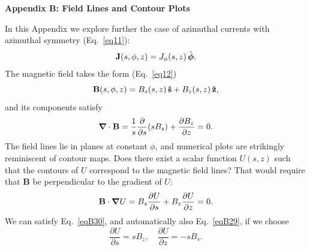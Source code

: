 \documentclass[aps,prb,twocolumn,groupedaddress,noshowpacs,checklength,amsmath]{revtex4-1}
\newcommand{\grad}{\mbox{\boldmath $\nabla$}}
\def\zhat{{\bf \hat z}}
\def\phat{{\hat{\mbox{\boldmath$\phi$}}}}
\def\shat{{\bf \hat s}}
\begin{document}
\bigskip

\centerline{\bf Appendix B: Field Lines and Contour Plots}

\bigskip

In this Appendix we explore further the case of azimuthal currents with azimuthal symmetry (Eq.~\ref{eq11}):
\begin{equation}
{\bf J}(s,\phi,z) = J_\phi(s,z)\,\phat.\label{eqB27}
\end{equation}
The magnetic field takes the form (Eq.~\ref{eq12})
\begin{equation}
{\bf B}(s,\phi, z) = B_s(s,z)\,\shat + B_z(s,z)\, \zhat,\label{eqB28}
\end{equation}
and its components satisfy
\begin{equation}
\grad \cdot {\bf B} = \frac{1}{s}\frac{\partial}{\partial s}(sB_s) + \frac{\partial B_z}{\partial z} = 0.\label{eqB29}
\end{equation}
The field lines lie in planes at constant $\phi$, and numerical plots are strikingly reminiscent of contour maps.  Does there exist a scalar function $U(s,z)$ such that the contours of $U$ correspond to the magnetic field lines?  That would require that {\bf B} be perpendicular to the gradient of $U$:
\begin{equation}
{\bf B}\cdot \grad U = B_s\frac{\partial U}{\partial s} + B_z\frac{\partial U}{\partial z} = 0.\label{eqB30}
\end{equation}
We can satisfy Eq.~\ref{eqB30}, and automatically also Eq.~\ref{eqB29}, if we choose
\begin{equation}
\frac{\partial U}{\partial s} = sB_z,\quad \frac{\partial U}{\partial z} = -sB_s.\label{eqB31}
\end{equation}  
\end{document}
